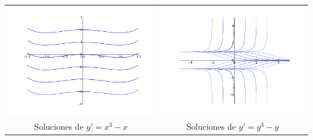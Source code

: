 \begin{tabular}{cc}
\includegraphics[scale=.3]{imagenes/sol_paralelas.png} &\hspace{-1.5cm}\includegraphics[scale=.3]{imagenes/sol_paralelas2.png} \\
Soluciones de $y'=x^3-x$ &\hspace{-1.5cm}Soluciones de $y'=y^3-y$
\end{tabular}





